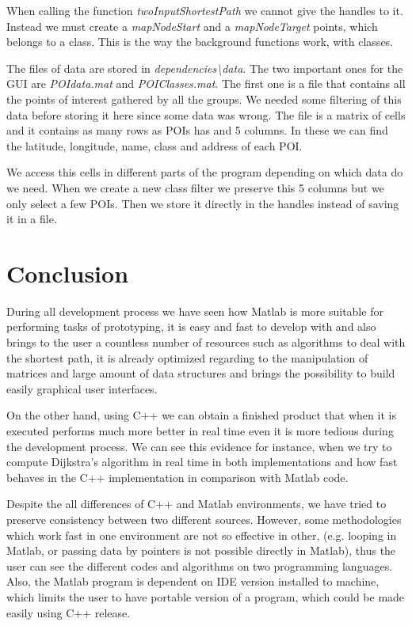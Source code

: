 \documentclass{article}
\begin{document}
When calling the function \textit{twoInputShortestPath} we cannot give the handles to it. Instead we must create a \textit{mapNodeStart} and a \textit{mapNodeTarget} points, which belongs to a class. This is the way the background functions work, with classes.

The files of data are stored in \textit{dependencies\textbackslash data}. The two important ones for the GUI are \textit{POIdata.mat} and \textit{POIClasses.mat}. The first one is a file that contains all the points of interest gathered by all the groups. We needed some filtering of this data before storing it here since some data was wrong. The file is a matrix of cells and it contains as many rows as POIs has and 5 columns. In these we can find the latitude, longitude, name, class and address of each POI.

We access this cells in different parts of the program depending on which data do we need. When we create a new class filter we preserve this 5 columns but we only select a few POIs. Then we store it directly in the handles instead of saving it in a file.

\clearpage
\section{Conclusion}
During all development process we have seen how Matlab is more suitable for performing tasks of prototyping, it is easy and fast to develop with and also brings to the user a countless number of resources such as algorithms to deal with the shortest path, it is already optimized regarding to the manipulation of matrices and large amount of data structures and brings the possibility to build easily graphical user interfaces.

On the other hand, using C++ we can obtain a finished product that when it is executed performs much more better in real time even it is more tedious during the development process. We can see this evidence for instance, when we try to compute Dijkstra's algorithm in real time in both implementations and how fast behaves in the C++ implementation in comparison with Matlab code. 

Despite the all differences of C++ and Matlab environments, we have tried to preserve consistency between two different sources. However, some methodologies which work fast in one environment are not so effective in other, (e.g. looping in Matlab, or passing data by pointers is not possible directly in Matlab), thus the user can see the different codes and algorithms on two programming languages. Also, the Matlab program is dependent on IDE version installed to machine, which limits the user to have portable version of a program, which could be made easily using C++ release.
\end{document}
